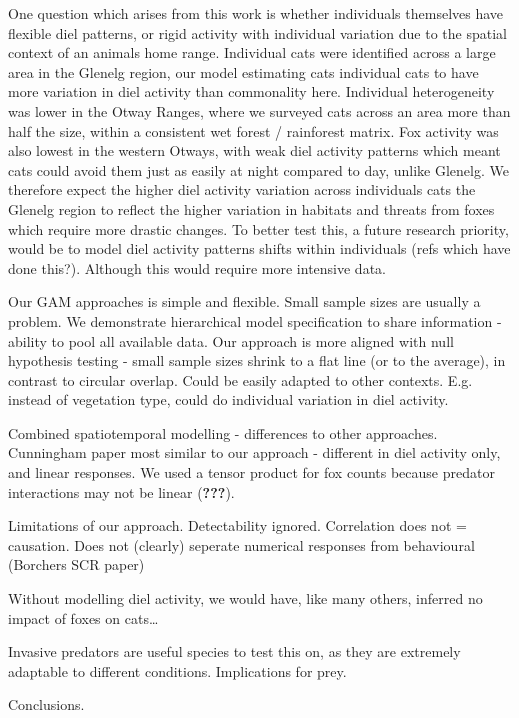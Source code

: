 \documentclass[11pt,a4paper,titlepage,twoside,openright]{style/unimelbthesis}
\begin{document}
\begin{mainmatter}
One question which arises from this work is whether individuals themselves have flexible diel patterns, or rigid activity with individual variation due to the spatial context of an animals home range. Individual cats were identified across a large area in the Glenelg region, our model estimating cats individual cats to have more variation in diel activity than commonality here. Individual heterogeneity was lower in the Otway Ranges, where we surveyed cats across an area more than half the size, within a consistent wet forest / rainforest matrix. Fox activity was also lowest in the western Otways, with weak diel activity patterns which meant cats could avoid them just as easily at night compared to day, unlike Glenelg. We therefore expect the higher diel activity variation across individuals cats the Glenelg region to reflect the higher variation in habitats and threats from foxes which require more drastic changes. To better test this, a future research priority, would be to model diel activity patterns shifts within individuals (refs which have done this?).
Although this would require more intensive data.

Our GAM approaches is simple and flexible.
Small sample sizes are usually a problem. We demonstrate hierarchical model specification to share information - ability to pool all available data.
Our approach is more aligned with null hypothesis testing - small sample sizes shrink to a flat line (or to the average), in contrast to circular overlap.
Could be easily adapted to other contexts. E.g. instead of vegetation type, could do individual variation in diel activity.

Combined spatiotemporal modelling - differences to other approaches.
Cunningham paper most similar to our approach - different in diel activity only, and linear responses.
We used a tensor product for fox counts because predator interactions may not be linear ({\textbf{???}}).

Limitations of our approach.
Detectability ignored.
Correlation does not = causation.
Does not (clearly) seperate numerical responses from behavioural (Borchers SCR paper)

Without modelling diel activity, we would have, like many others, inferred no impact of foxes on cats\ldots{}

Invasive predators are useful species to test this on, as they are extremely adaptable to different conditions.
Implications for prey.

Conclusions.

\hypertarget{otways17}{%
}
\end{mainmatter}
\end{document}
